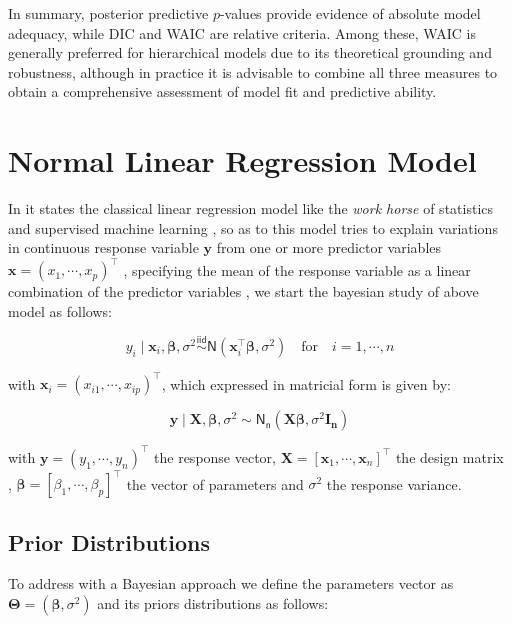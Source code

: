 \vspace{0.5cm}

In summary, posterior predictive $p$-values provide evidence of absolute model adequacy, while DIC and WAIC are relative criteria. Among these, WAIC is generally preferred for hierarchical models due to its theoretical grounding and robustness, although in practice it is advisable to combine all three measures to obtain a comprehensive assessment of model fit and predictive ability.


\section{Normal Linear Regression Model}

In \cite{ML_MURPHY} it states the classical linear regression model like the \textit{work horse} of statistics and supervised machine learning , so as to this model tries to explain variations in  continuous response variable $\bm{y}$ from one or more predictor variables $\bm{x}=(x_{1},\cdots,x_{p})^\top$ , specifying the mean of the response variable as a linear combination of the predictor variables \cite{Christensen2010-ps} , we start the bayesian study of above model as follows:

\begin{equation}
    \label{LRM_i}
    y_i \mid \bm{x}_i,\bm{\beta},\sigma^2\stackrel{\mathsf{iid}}{\sim} \mathsf{N}\left(\bm{x}_i^\top\bm{\beta},\sigma^2\right)\quad\text{for}\quad i=1,\cdots,n
\end{equation}

with $\bm{x}_i=(x_{i1},\cdots,x_{ip})^\top$, which expressed in matricial form is given by:

\begin{equation}
    \label{LRM}
    \bm{y} \mid \bm{X},\bm{\beta},\sigma^2\sim\mathsf{N_n}\left(\bm{X}\bm{\beta},\sigma^2\bm{I_n}\right)
\end{equation}

with $\bm{y}=(y_1,\cdots,y_n)^\top$ the response vector, $\bm{X}=\left[\bm{x}_1,\cdots,\bm{x}_n\right]^\top$ the design matrix , $\bm{\beta}=\left[\beta_1,\cdots,\beta_p\right]^\top$ the vector of parameters and $\sigma^2$ the response variance.

\subsection{Prior Distributions}

To address with a Bayesian approach we define the parameters vector as $\bm{\Theta}=(\bm{\beta},\sigma^2)$ and its priors distributions as follows:

